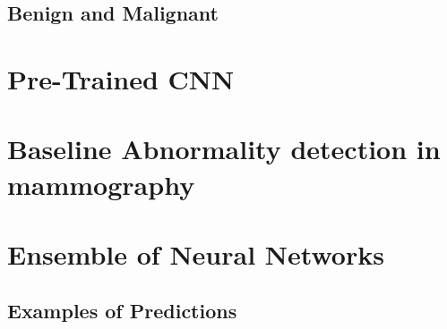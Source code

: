 \documentclass{book}
\begin{document}
        \section{Benign and Malignant}  %

    
    \chapter{Pre-Trained CNN}


    \chapter{Baseline Abnormality detection in mammography}


    \chapter{Ensemble of Neural Networks}
    \section{Examples of Predictions}

\end{document}
